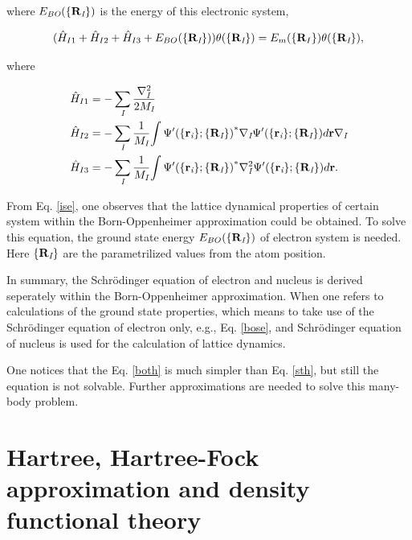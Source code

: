\documentclass[a4paper, 12pt, titlepage,oneside,drop]{kthesis}
\begin{document}
\noindent where $E_\textit{BO}{(\{\textbf{R}_{\textit I}\})}$ is the energy of this electronic system,

\begin{equation}\label{ise}
( \hat{H}_{I1}+\hat{H}_{I2}+\hat{H}_{I3}+E_{BO}(\{{\textbf R}_{\textit I}\}) ) {\theta(\{\textbf{R}_{\textit I}\})} = E_{m}(\{{\textbf R_I}\}) {\theta(\{\textbf{R}_{\textit I}\})},
\end{equation}

\noindent where

\begin{equation}\begin{split}
 &  \hat{H}_{I1} = - \sumi<I> \frac{{{\nabla}_{\textit{I}}^{2}}}{2 M_\textit{I}}   \\
 &  \hat{H}_{I2} = - \sumi<I> \frac{1}{M_\textit{I}} {\int {\Psi'(\{\textbf{r}_{\textit{i}}\}; \{\textbf{R}_{\textit I}\})}^{\ast} {{\nabla}_{\textit{I}}} {{\Psi'(\{\textbf{r}_{\textit{i}} \}; \{\textbf{R}_{\textit I}\})}} d {\textbf r }} {{\nabla}_{\textit{I}}}  \\
 &  \hat{H}_{I3} = - \sumi<I> \frac{1}{M_\textit{I}} {\int {{\Psi'(\{\textbf{r}_{\textit{i}}\}; \{\textbf{R}_{\textit I}\})}}^{\ast} {{\nabla}_{\textit{I}}^{2}} {{\Psi'(\{\textbf{r}_{\textit{i}} \}; \{\textbf{R}_{\textit I}\})}} d {\textbf r }}. 
\end{split}\end{equation}

\noindent From Eq. \ref{ise}, one observes that the lattice dynamical properties of certain system within the Born-Oppenheimer approximation could be obtained. To solve this equation,
the ground state energy $E_{BO}(\{{{\textbf R}_{\textit I}}\})$ of electron system is needed. Here $\{{\textbf R}_{\textit I}\}$ are the parametrilized values from the atom position.
 

\noindent In summary, the Schrödinger equation of electron and nucleus is derived seperately within the Born-Oppenheimer approximation. When one refers to calculations of the ground state properties,
which means to take use of the Schrödinger equation of electron only, e.g., Eq. \ref{bose}, and Schrödinger equation of nucleus is used for the calculation of lattice dynamics.

One notices that the Eq. \ref{both} is much simpler than Eq. \ref{sth}, but still the equation is not solvable. Further approximations  are needed
to solve this many-body problem.


\section{Hartree, Hartree-Fock approximation and density functional theory}
\end{document}
